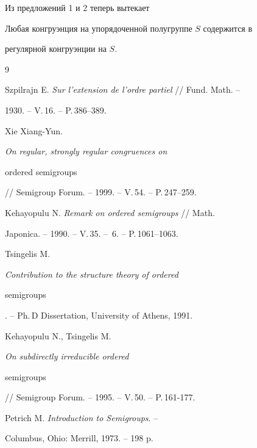 

 


Из предложений 1 и 2 теперь вытекает 


 


\begin{thmnonum} 


Любая конгруэнция на упорядоченной полугруппе $S$ содержится в 


регулярной конгруэнции на $S$. 


\end{thmnonum} 


 


\begin{thebibliography}{9} 


 




Szpilrajn E. {\em Sur l'extension de l'ordre partiel} // Fund. Math. -- 


1930. -- V.\,16. -- P.\,386--389. 




Xie Xiang-Yun. {\em On regular, strongly regular congruences on


ordered semigroups} // Semigroup Forum. -- 1999. -- V.\,54. -- P.\,247--259.




Kehayopulu N. {\em Remark on ordered semigroups} // Math.


Japonica. -- 1990. -- V.\,35. -- \No\,6. -- P.\,1061--1063. 




Tsingelis M. {\em Contribution to the structure theory of ordered 


semigroups}. -- Ph.\,D Dissertation, University of Athens, 1991. 




Kehayopulu N., Tsingelis M. {\em On subdirectly irreducible ordered 


semigroups} // Semigroup Forum. -- 1995. -- V.\,50. -- P.\,161-177. 




Petrich M. {\em Introduction to Semigroups}. --


Columbus, Ohio: Merrill, 1973. -- 198 p.


 


 


\end{thebibliography} 


 


\vskip 2cm 


 






 


\label{end} 


 


